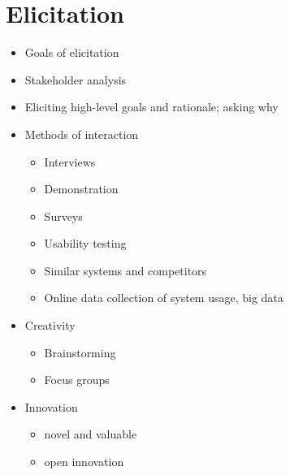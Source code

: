 
\chapter{Elicitation}

\begin{itemize}
  \item Goals of elicitation
  \item Stakeholder analysis
  \item Eliciting high-level goals and rationale; asking why

  \item Methods of interaction
  \begin{itemize}
    \item Interviews
    \item Demonstration
    \item Surveys
    \item Usability testing
    \item Similar systems and competitors
    \item Online data collection of system usage, big data
  \end{itemize}

  \item Creativity
  \begin{itemize}
    \item Brainstorming
    \item Focus groups
  \end{itemize}

  \item Innovation
  \begin{itemize}
    \item novel and valuable
    \item open innovation
  \end{itemize}

\end{itemize}
